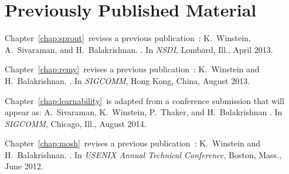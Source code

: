\chapter*{Previously Published Material}
%

{
\setlength{\parindent}{0 pt}
\setlength{\parskip}{\baselineskip}

Chapter~\ref{chap:sprout}~revises a previous
publication~\cite{sprout}:
K.~Winstein, A.~Sivaraman, and H.~Balakrishnan.
.
\newblock In {\em NSDI}, Lombard, Ill., April 2013.

Chapter~\ref{chap:remy}~revises a previous publication~\cite{remy}:
K.~Winstein and H.~Balakrishnan.
.
\newblock In {\em SIGCOMM}, Hong Kong, China, August 2013.

Chapter~\ref{chap:learnability}~is adapted from a conference
submission that will appear as:
A.~Sivaraman, K.~Winstein, P.~Thaker, and H.~Balakrishnan
. \newblock In {\em
  SIGCOMM}, Chicago, Ill., August 2014.

Chapter~\ref{chap:mosh}~revises a previous publication~\cite{mosh}:
K.~Winstein and H.~Balakrishnan.
.
\newblock In {\em USENIX Annual Technical Conference}, Boston, Mass., June
  2012.
}
